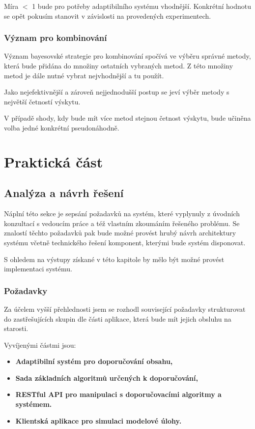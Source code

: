 \documentclass[thesis=M,czech]{FITthesis}[2014/05/07]
\begin{document}
Míra $<$ 1 bude pro potřeby adaptibilního systému vhodnější. Konkrétní hodnotu se opět pokusím stanovit v závislosti na provedených experimentech.

\subsection{Význam pro kombinování}
\label{lkombinování}
Význam bayesovské strategie pro kombinování spočívá ve výběru správné metody, která bude přidána do množiny ostatních vybraných metod. Z této množiny metod je dále nutné vybrat nejvhodnější a tu použít.

Jako nejefektivnější a zároveň nejjednodušší postup se jeví výběr metody s největší četností výskytu. 

V případě shody, kdy bude mít více metod stejnou četnost výskytu, bude učiněna volba jedné konkrétní pseudonáhodně.

\chapter{Praktická část}
\label{chap:prakt}
\section{Analýza a návrh řešení}
\label{chap:analysis}
Náplní této sekce je sepsání požadavků na systém, které vyplynuly z úvodních konzultací s vedoucím práce a též vlastním zkoumáním řešeného problému. Se znalostí těchto požadavků pak bude možné provést hrubý návrh architektury systému včetně technického řešení komponent, kterými bude systém disponovat.

S ohledem na výstupy získané v této kapitole by mělo být možné provést implementaci systému.

\subsection{Požadavky}
\label{sec:req}
Za účelem vyšší přehlednosti jsem se rozhodl související požadavky strukturovat do zastřešujících skupin dle části aplikace, která bude mít jejich obsluhu na starosti.

Vyvíjenými částmi jsou:

\begin{itemize}
  \item \textbf{Adaptibilní systém pro doporučování obsahu,}
  \item \textbf{Sada základních algoritmů určených k doporučování,}
  \item \textbf{RESTful API pro manipulaci s doporučovacími algoritmy a systémem.}
  \item \textbf{Klientská aplikace pro simulaci modelové úlohy.}    
\end{itemize}
\end{document}
